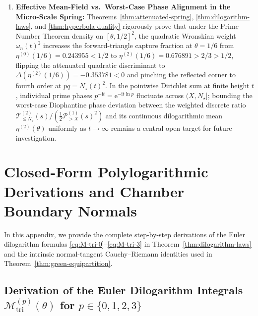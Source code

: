 \documentclass[11pt,reqno]{amsart}
\theoremstyle{definition}
\theoremstyle{remark}
\numberwithin{equation}{section}
\newcommand{\ii}{\mathrm{i}}
\newcommand{\ee}{\mathrm{e}}
\newcommand{\tri}{\mathrm{tri}}
\begin{document}
\begin{enumerate}[label=\upshape(\arabic*),leftmargin=2.2em]
\item \textbf{Effective Mean-Field vs.\ Worst-Case Phase Alignment in the Micro-Scale Spring:} Theorems~\ref{thm:attenuated-spring}, \ref{thm:dilogarithm-laws}, and \ref{thm:hyperbola-duality} rigorously prove that under the Prime Number Theorem density on $[\theta,1/2]^2$, the quadratic Wronskian weight $\omega_n(t)^2$ increases the forward-triangle capture fraction at $\theta=1/6$ from $\eta^{(0)}(1/6)=0.243955 < 1/2$ to $\eta^{(2)}(1/6)=0.676891 > 2/3 > 1/2$, flipping the attenuated quadratic discriminant to $\Delta(\eta^{(2)}(1/6)) = -0.353781 < 0$ and pinching the reflected corner to fourth order at $pq = N_\star(t)^2$. In the pointwise Dirichlet sum at finite height $t$, individual prime phases $p^{-\ii t} = \ee^{-\ii t\ln p}$ fluctuate across $(X,N_\star]$; bounding the worst-case Diophantine phase deviation between the weighted discrete ratio $\mathcal{T}_{\le N_\star}^{(2)}(s)/(\frac{1}{2}\mathcal{P}_{>X}^{(1)}(s)^2)$ and its continuous dilogarithmic mean $\eta^{(2)}(\theta)$ uniformly as $t \to \infty$ remains a central open target for future investigation.
\end{enumerate}

\appendix

\section{Closed-Form Polylogarithmic Derivations and Chamber Boundary Normals}\label{app:dilogarithm}

In this appendix, we provide the complete step-by-step derivations of the Euler dilogarithm formulas \eqref{eq:M-tri-0}--\eqref{eq:M-tri-3} in Theorem~\ref{thm:dilogarithm-laws} and the intrinsic normal-tangent Cauchy--Riemann identities used in Theorem~\ref{thm:green-equipartition}.

\subsection{Derivation of the Euler Dilogarithm Integrals \texorpdfstring{$\mathcal{M}_{\tri}^{(p)}(\theta)$ for $p \in \{0,1,2,3\}$}{M\_tri(theta) for p in 0,1,2,3}}
\end{document}
